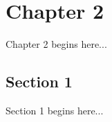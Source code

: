 \chapter{Chapter 2}
%
\label{chap:chap2}

Chapter 2 begins here...

\section{Section 1}
\label{sec:chap2sec1}

Section 1 begins here...
